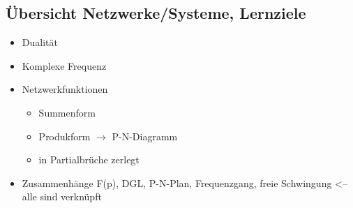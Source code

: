 \subsection{Übersicht Netzwerke/Systeme, Lernziele}
\begin{itemize}
  \item Dualität
  \item Komplexe Frequenz
  \item Netzwerkfunktionen
  \begin{itemize}
    \item Summenform
    \item Produkform $\rightarrow$ P-N-Diagramm
    \item in Partialbrüche zerlegt
	\end{itemize}
	\item Zusammenhänge
	F(p), DGL, P-N-Plan, Frequenzgang, freie Schwingung <-- alle sind verknüpft
\end{itemize}	